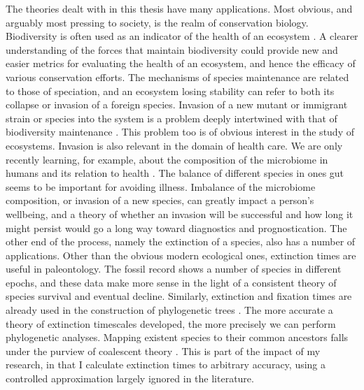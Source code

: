 The theories dealt with in this thesis have many applications. 
Most obvious, and arguably most pressing to society, is the realm of conservation biology. Biodiversity is often used as an indicator of the health of an ecosystem \cite{McKane2000,Pimm1988,Kalyuzhny2014,Peterson1997,Shaffer1981}. 
A clearer understanding of the forces that maintain biodiversity could provide new and easier metrics for evaluating the health of an ecosystem, and hence the efficacy of various conservation efforts.
The mechanisms of species maintenance are related to those of speciation, and an ecosystem losing stability can refer to both its collapse or invasion of a foreign species. 
Invasion of a new mutant or immigrant strain or species into the system is a problem deeply intertwined with that of biodiversity maintenance \cite{Hubbell2001}. 
This problem too is of obvious interest in the study of ecosystems. 
Invasion is also relevant in the domain of health care. 
We are only recently learning, for example, about the composition of the microbiome in humans and its relation to health \cite{Coburn2015,Korem2015,Manichanh2010,Theriot2014,Kinross2011}. 
The balance of different species in ones gut seems to be important for avoiding illness. 
Imbalance of the microbiome composition, or invasion of a new species, can greatly impact a person's wellbeing, and a theory of whether an invasion will be successful and how long it might persist would go a long way toward diagnostics and prognostication.
The other end of the process, namely the extinction of a species, also has a number of applications. 
Other than the obvious modern ecological ones, extinction times are useful in paleontology. 
The fossil record shows a number of species in different epochs, and these data make more sense in the light of a consistent theory of species survival and eventual decline. %
Similarly, extinction and fixation times are already used in the construction of phylogenetic trees \cite{Rogers2014,Rice2004,Blythe2007}. 
The more accurate a theory of extinction timescales developed, the more precisely we can perform phylogenetic analyses. 
Mapping existent species to their common ancestors falls under the purview of coalescent theory \cite{Kingman1982}. %
This is part of the impact of my research, in that I calculate extinction times to arbitrary accuracy, using a controlled approximation largely ignored in the literature. 


